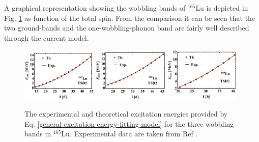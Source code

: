 A graphical representation showing the wobbling bands of $^{165}$Lu is depicted in Fig. \ref{excitation-energies-th-165Lu} as function of the total spin. From the comparison it can be seen that the two ground-bands and the one-wobbling-phonon band are fairly well described through the current model.
\begin{figure}
    \centering
    \includegraphics[width=0.32\textwidth]{Chapters/Figures/Lu-exp-energies/fig4a_lu165.pdf}
    \includegraphics[width=0.32\textwidth]{Chapters/Figures/Lu-exp-energies/fig4b_lu165.pdf}
    \includegraphics[width=0.32\textwidth]{Chapters/Figures/Lu-exp-energies/fig4c_lu165.pdf}
    \caption{The experimental and theoretical excitation energies provided by Eq. \ref{general-excitation-energy-fitting-model} for the three wobbling bands in $^{165}$Lu. Experimental data are taken from Ref \cite{schonwasser2003one}.}
    \label{excitation-energies-th-165Lu}
\end{figure}


